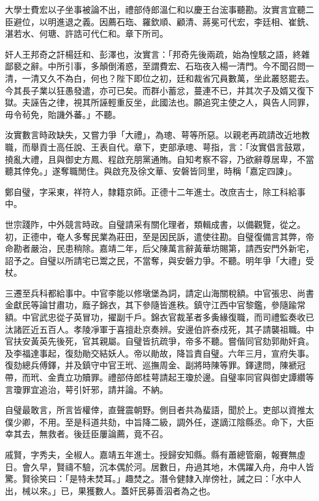 \begin{pinyinscope}
大學士費宏以子坐事被論不出，禮部侍郎溫仁和以慶王台浤事聽勘。汝實言宜聽二臣避位，以明進退之義。因薦石珤、羅欽順、顧清、蔣冕可代宏，李廷相、崔銑、湛若水、何瑭、許誥可代仁和。章下所司。

奸人王邦奇之訐楊廷和、彭澤也，汝實言：「邦奇先後兩疏，始為惶駭之語，終雜鄙褻之辭。中所引事，多顛倒淆惑，至謂費宏、石珤夜入楊一清門。今不聞召問一清，一清又久不為白，何也？陛下即位之初，廷和裁省冗員數萬，坐此叢怒罷去。今其長子業以狂愚發遣，亦可已矣。而群小蓄忿，蔓連不已，并其次子及婿又復下獄。夫誣告之律，視其所誣輕重反坐，此國法也。願追究主使之人，與告人同罪，毋令茍免，貽譏外蕃。」不聽。

汝實數言時政缺失，又嘗力爭「大禮」，為璁、萼等所惡。以親老再疏請改近地教職，而舉貢士高任說、王表自代。章下，吏部承璁、萼指，言：「汝實倡言鼓眾，撓亂大禮，且與御史方鳳、程啟充朋黨通賄。自知考察不容，乃欲辭尊居卑，不當聽其倖免。」遂奪職閒住。與啟充及徐文華、安磐皆同里，時稱「嘉定四諫」。

鄭自璧，字采東，祥符人，隸籍京師。正德十二年進士。改庶吉士，除工科給事中。

世宗踐阼，中外競言時政。自璧請采有關化理者，類輯成書，以備觀覽，從之。初，正德中，奄人多奪民業為莊田，至是因民訴，遣使往勘。自璧復備言其弊，帝命勘者嚴治，民患稍除。嘉靖二年，后父陳萬言辭黃華坊賜第，請西安門外新宅，詔予之。自璧以所請宅已鬻之民，不當奪，與安磐力爭。不聽。明年爭「大禮」受杖。

三遷至兵科都給事中。中官李能以修墩堡為詞，請定山海關稅額。中官張忠、尚書金獻民等論甘肅功，廕子錦衣，其下參隨皆進秩。鎮守江西中官黎鑑，參隨踰常額。中官武忠從子英冒功，擢副千戶。錦衣官裁革者多夤緣復職，而司禮監奏收已汰諸匠近五百人。孝陵凈軍于喜擅赴京奏辨。安邊伯許泰戍死，其子請襲祖職。中官扶安黃英先後死，官其親屬。自璧皆抗疏爭，帝多不聽。嘗偕同官劾郭勛奸貪。及李福達事起，復劾勛交結妖人。帝以勛故，降旨責自璧。六年三月，宣府失事。復劾總兵傅鐸，并及鎮守中官王玳、巡撫周金、副將時陳等罪。鐸逮問，陳褫冠帶，而玳、金責立功贖罪。禮部侍郎桂萼請起王瓊於邊。自璧率同官與御史譚纘等言瓊罪宜追治，萼引奸邪，請并論。不納。

自璧最敢言，所言皆權倖，直聲震朝野。側目者共為蜚語，聞於上。吏部以資推太僕少卿，不用。至是科道共劾，中旨降二級，調外任，遂謫江陰縣丞。命下，大臣幸其去，無救者。後廷臣屢論薦，竟不召。

戚賢，字秀夫，全椒人。嘉靖五年進士。授歸安知縣。縣有蕭總管廟，報賽無虛日。會久早，賢禱不驗，沉本偶於河。居數日，舟過其地，木偶躍入舟，舟中人皆驚。賢徐笑曰：「是特未焚耳。」趣焚之。潛令健隸入岸傍社，誡之曰：「水中人出，械以來。」已，果獲數人。蓋奸民募善泅者為之也。


\end{pinyinscope}
